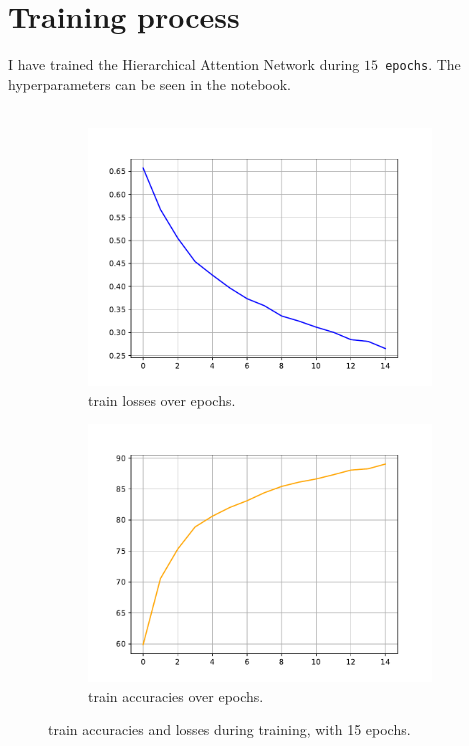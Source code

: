 \documentclass[a4paper]{article}
\begin{document}
\section{Training process}
\noindent
I have trained the Hierarchical Attention Network during \texttt{$15$ epochs}.
The hyperparameters can be seen in the notebook.
\\
\\
\noindent
\begin{figure}[H]
    \centering
    \begin{subfigure}[b]{0.45\textwidth}
        \centering
        \includegraphics[width=\textwidth]{../figures/train_loss.pdf}
        \caption{train losses over epochs.}
        \label{fig:image1}
    \end{subfigure}
    \hfill
    \begin{subfigure}[b]{0.45\textwidth}
        \centering
        \includegraphics[width=\textwidth]{../figures/train_accs.pdf}
        \caption{train accuracies over epochs.}
        \label{fig:image2}
    \end{subfigure}
    \caption{train accuracies and losses during training, with 15 epochs.}
    \label{fig:images}
\end{figure}
\end{document}
